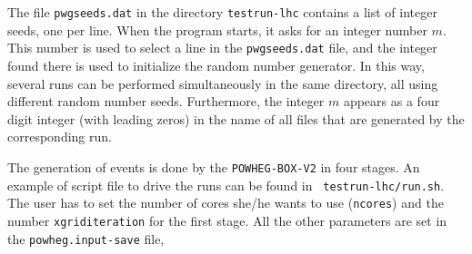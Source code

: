 \documentclass[paper]{JHEP3}
\newcommand\POWHEGBOXV{{\tt POWHEG-BOX-V2}}
\begin{document}
\noindent
The file {\tt pwgseeds.dat} in the directory {\tt testrun-lhc}
contains a list of integer seeds, one per line. When the program starts, it
asks for an integer number $m$. This number is used to select a line in the
{\tt pwgseeds.dat} file, and the integer found there is used to
initialize the random number generator. In this way, several runs can be
performed simultaneously in the same directory, all using different random
number seeds. Furthermore, the integer $m$ appears as a four digit integer
(with leading zeros) in the name of all files that are generated by the
corresponding run.

The generation of events is done by the \POWHEGBOXV{} in four stages.  An
example of script file to drive the runs can be found in {\tt
  testrun-lhc/run.sh}.  The user has to set the number of cores she/he wants
to use ({\tt ncores}) and the number {\tt xgriditeration} for the first
stage. All the other parameters are set in the {\tt powheg.input-save} file,
\end{document}
